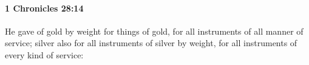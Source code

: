 
		\paragraph{1 Chronicles 28:14} %
			\label{1CHRONICLES-28-14}

			He gave of gold by weight for things of gold, for all instruments of all manner of service; silver also for all instruments of silver by weight, for all instruments of every kind of service:


